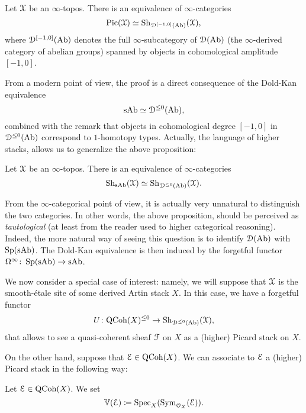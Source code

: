 \begin{prop}
	Let $\mathcal X$ be an $\infty$-topos.
	There is an equivalence of $\infty$-categories
	\[ \mathrm{Pic}(\mathcal X) \simeq \mathrm{Sh}_{\mathcal D^{[-1,0]}(\mathrm{Ab})}(\mathcal X) , \]
	where $\mathcal D^{[-1,0]}(\mathrm{Ab})$ denotes the full $\infty$-subcategory of $\mathcal D(\mathrm{Ab})$ (the $\infty$-derived category of abelian groups) spanned by objects in cohomological amplitude $[-1,0]$.
\end{prop}

From a modern point of view, the proof is a direct consequence of the Dold-Kan equivalence
\[ \mathrm{sAb} \simeq \mathcal D^{\le 0}(\mathrm{Ab}) , \]
combined with the remark that objects in cohomological degree $[-1,0]$ in $\mathcal D^{\le 0}(\mathrm{Ab})$ correspond to $1$-homotopy types.
Actually, the language of higher stacks, allows us to generalize the above proposition:

\begin{prop}
	Let $\mathcal X$ be an $\infty$-topos.
	There is an equivalence of $\infty$-categories
	\[ \mathrm{Sh}_{\mathrm{sAb}}(\mathcal X) \simeq \mathrm{Sh}_{\mathcal D^{\le 0}(\mathrm{Ab})}(\mathcal X) . \]
\end{prop}

\begin{rem}
	From the $\infty$-categorical point of view, it is actually very unnatural to distinguish the two categories.
	In other words, the above proposition, should be perceived as \emph{tautological} (at least from the reader used to higher categorical reasoning).
	Indeed, the more natural way of seeing this question is to identify $\mathcal D(\mathrm{Ab})$ with $\operatorname{Sp}(\mathrm{sAb})$. The Dold-Kan equivalence is then induced by the forgetful functor $\Omega^\infty \colon \operatorname{Sp}(\mathrm{sAb}) \to \mathrm{sAb}$.
\end{rem}

We now consider a special case of interest: namely, we will suppose that $\mathcal X$ is the smooth-\'etale site of some derived Artin stack $X$.
In this case, we have a forgetful functor
\[ U \colon \mathrm{QCoh}(X)^{\le 0} \to \mathrm{Sh}_{\mathcal D^{\le 0}(\mathrm{Ab})}(\mathcal X) , \]
that allows to see a quasi-coherent sheaf $\mathcal F$ on $X$ as a (higher) Picard stack on $X$.

On the other hand, suppose that $\mathcal E \in \mathrm{QCoh}(X)$.
We can associate to $\mathcal E$ a (higher) Picard stack in the following way:

\begin{defin}
	Let $\mathcal E \in \mathrm{QCoh}(X)$.
	We set
	\[ \mathbb V(\mathcal E) \coloneqq \operatorname{Spec}_X(\operatorname{Sym}_{\mathcal O_X}(\mathcal E)) . \]
\end{defin}

